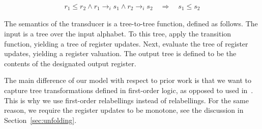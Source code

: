 \begin{definition}
\begin{itemize}
\begin{enumerate}
        \begin{align*}
            r_1 \leq r_2 \land r_1 \to_i s_1  \land  r_2 \to_i s_2  \quad \Rightarrow \quad  s_1 \leq s_2
        \end{align*}
    \end{enumerate}
\end{itemize}
\end{definition}


The semantics of the transducer is  a tree-to-tree function, defined as follows. The input is a tree over the input alphabet. To this tree,  apply the transition function, yielding a tree of register updates. Next, evaluate the tree of register updates, yielding a register valuation. The output tree is defined to be the contents of the designated output register.


The main difference of our model with respect to prior work is that we want to capture  tree transformations defined in first-order logic, as opposed to \mso used in~\cite{bloem_comparison_2000,alurStreamingStringTransducers2011,alur2017streaming}. This is why we use first-order relabellings instead of  \mso relabellings.  For the same reason, we require the register updates to be monotone, see the discussion in Section~\ref{sec:unfolding}.  

